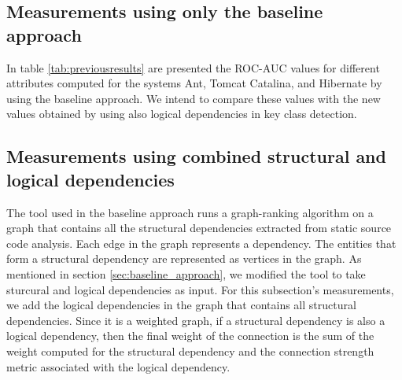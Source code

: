 \documentclass[runningheads]{comsis2}
\begin{document}
\subsection{Measurements using only the baseline approach}
\label{sec:measure_baseline}

In table \ref{tab:previousresults} are presented the ROC-AUC values for different attributes computed for the systems Ant, Tomcat Catalina, and Hibernate by using the baseline approach. We intend to compare these values with the new values obtained by using also logical dependencies in key class detection.

\begin{table}
\renewcommand{\arraystretch}{1}
\caption{ROC-AUC metric values extracted. }
\label{tab:previousresults}
\centering
{}
\end{table}


\subsection{Measurements using combined structural and logical dependencies}
\label{sec:measure_ld_sd}

The tool used in the baseline approach runs a graph-ranking algorithm on a graph that contains all the structural dependencies extracted from static source code analysis.
Each edge in the graph represents a dependency. The entities that form a structural dependency are represented as vertices in the graph. 
As mentioned in section \ref{sec:baseline_approach}, we modified the tool to take sturcural and logical dependencies as input.
For this subsection's measurements, we add the logical dependencies in the graph that contains all structural dependencies. Since it is a weighted graph, if a structural dependency is also a logical dependency, then the final weight of the connection is the sum of the weight computed for the structural dependency and the connection strength metric associated with the logical dependency.
\end{document}
